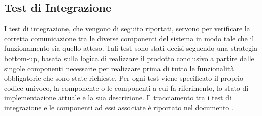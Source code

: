 \documentclass[a4paper, titlepage]{article}
\begin{document}
\newpage
\subsection{Test di Integrazione}
I test di integrazione, che vengono di seguito riportati, servono per verificare la corretta comunicazione tra le diverse componenti del sistema  in modo tale che il funzionamento sia quello atteso.
\newline Tali test sono stati decisi seguendo una strategia bottom-up, basata sulla logica di realizzare il prodotto conclusivo a partire dalle singole componenti necessarie per realizzare  prima di tutto le funzionalità obbligatorie che sono state richieste.
\newline Per ogni test viene specificato il proprio codice univoco, la componente o le componenti a cui fa riferimento, lo stato di implementazione attuale e la sua descrizione. 
\newline Il tracciamento tra i test di integrazione e le componenti ad essi associate è riportato nel documento .
\end{document}

